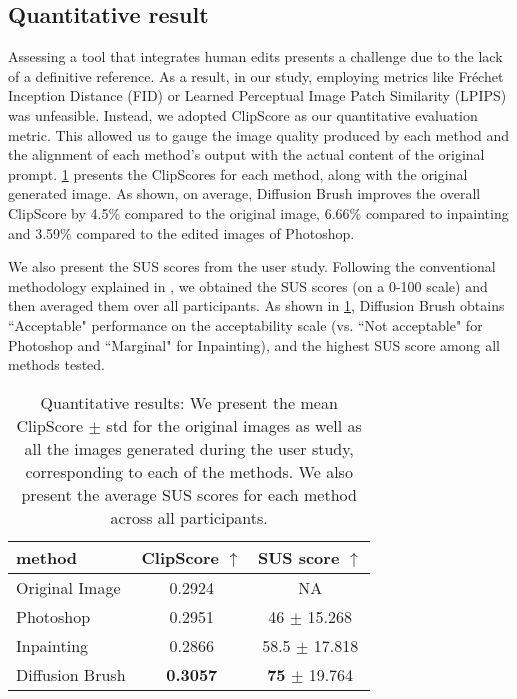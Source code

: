 \documentclass[10pt,twocolumn,letterpaper]{article}
\begin{document}
\subsection{Quantitative result}
Assessing a tool that integrates human edits presents a challenge due to the lack of a definitive reference. As a result, in our study, employing metrics like Fréchet Inception Distance (FID) or Learned Perceptual Image Patch Similarity (LPIPS) was unfeasible. Instead, we adopted ClipScore \cite{hessel2021clipscore} as our quantitative evaluation metric. This allowed us to gauge the image quality produced by each method and the alignment of each method's output with the actual content of the original prompt.
\cref{tab:results} presents the ClipScores for each method, along with the original generated image. As shown, on average, Diffusion Brush improves the overall ClipScore by 4.5\% compared to the original image, 6.66\% compared to inpainting and 3.59\% compared to the edited images of Photoshop.

We also present the SUS scores from the user study. Following the conventional methodology explained in \cite{brooke1996sus}, we obtained the SUS scores (on a 0-100 scale) and then averaged them over all participants. As shown in \cref{tab:results}, Diffusion Brush obtains ``Acceptable" performance on the acceptability scale \cite{bangor2009sus} (vs. ``Not acceptable" for Photoshop and ``Marginal" for Inpainting), and the highest SUS score among all methods tested.

\begin{table}
  \centering
  \begin{tabular}{@{}l|cc@{}}
    \toprule
     method & ClipScore $\uparrow$ & SUS score $\uparrow$ \\
    \midrule
    Original Image & 0.2924 & NA \\
    Photoshop & 0.2951 & 46 $\pm$ 15.268\\
    Inpainting & 0.2866 &58.5 $\pm$	17.818 \\ 
    Diffusion Brush & \textbf{0.3057} & \textbf{75} $\pm$	19.764\\
    \bottomrule
  \end{tabular}
  \caption{Quantitative results: We present the mean ClipScore $\pm$ std for the original images as well as all the images generated during the user study, corresponding to each of the methods. We also present the average SUS scores for each method across all participants.}
  \label{tab:results}
\end{table}
\end{document}
